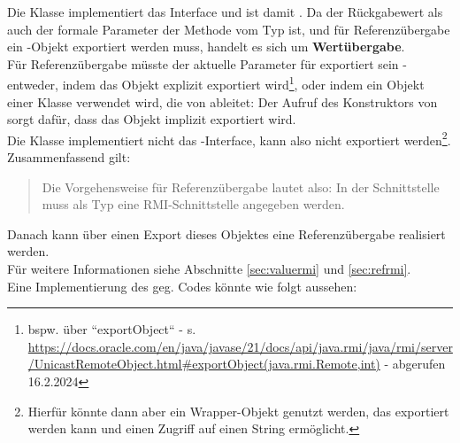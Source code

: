 \noindent
Die Klasse  implementiert das Interface  und ist damit .
Da der Rückgabewert als auch der formale Parameter der Methode  vom Typ  ist, und für Referenzübergabe ein -Objekt exportiert werden muss, handelt es sich um \textbf{Wertübergabe}.\\
Für Referenzübergabe müsste der aktuelle Parameter für  exportiert sein - entweder, indem das Objekt explizit exportiert wird\footnote{
bspw. über ``exportObject`` - s. \url{https://docs.oracle.com/en/java/javase/21/docs/api/java.rmi/java/rmi/server/UnicastRemoteObject.html#exportObject(java.rmi.Remote,int)} - abgerufen 16.2.2024
}, oder indem ein Objekt einer Klasse verwendet wird, die von  ableitet: Der Aufruf des Konstruktors von  sorgt dafür, dass das Objekt implizit exportiert wird.\\
Die Klasse  implementiert nicht das -Interface, kann also nicht exportiert werden\footnote{
Hierfür könnte dann aber ein Wrapper-Objekt genutzt werden, das exportiert werden kann und einen Zugriff auf einen String ermöglicht.}.\\

\noindent
Zusammenfassend gilt:

\blockquote[{\cite[344]{Oec22}}]{
    Die Vorgehensweise für Referenzübergabe lautet also: In der Schnittstelle muss als Typ eine RMI-Schnittstelle angegeben werden.
}

\noindent
Danach kann über einen Export dieses Objektes eine Referenzübergabe realisiert werden.\\

\noindent
Für weitere Informationen siehe Abschnitte \ref{sec:valuermi} und \ref{sec:refrmi}.\\

\noindent
Eine Implementierung des geg. Codes könnte wie folgt aussehen:

